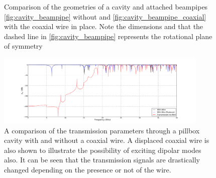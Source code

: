 \begin{figure}
\caption{Comparison of the geometries of a cavity and attached beampipes \ref{fig:cavity_beampipe} without and \ref{fig:cavity_beampipe_coaxial} with the coaxial wire in place. Note the dimensions and that the dashed line in \ref{fig:cavity_beampipe} represents the rotational plane of symmetry}
\end{figure}

\begin{figure}
\begin{center}
\includegraphics[width=0.9\textwidth]{Bench_Top_Measurements/figures/coax-trans-cavity.pdf}
\end{center}
\label{fig:cav-wire-tans}
\caption{A comparison of the transmission parameters through a pillbox cavity with and without a coaxial wire. A displaced coaxial wire is also shown to illustrate the possibility of exciting dipolar modes also. It can be seen that the transmission signals are drastically changed depending on the presence or not of the wire.}
\end{figure}

%
%
%
%
%
%
%
%
%
%
%
